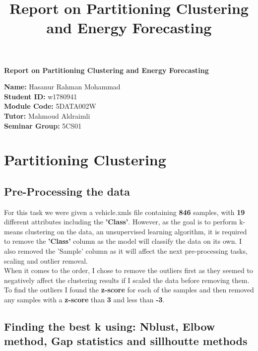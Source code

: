 \documentclass[12pt]{article}
\title{Report on Partitioning Clustering and  Energy Forecasting}
\newcommand{\name}{Hasanur Rahman Mohammad}
\newcommand{\studentID}{w1780941}
\newcommand{\moduleCode}{5DATA002W}
\newcommand{\tutor}{Mahmoud Aldraimli}
\newcommand{\seminarGroup}{5CS01}
\begin{document}
\begin{titlepage}

    \center
    {\LARGE\bfseries Report on Partitioning Clustering and Energy Forecasting}
    \\ [2cm]
    \begin{flushleft}
        \textbf{Name: }\name \\
        \textbf{Student ID: }\studentID \\[0.5cm]
        \textbf{Module Code: }\moduleCode \\
        \textbf{Tutor: }\tutor \\
        \textbf{Seminar Group: }\seminarGroup\\
    \end{flushleft}

\end{titlepage}

\tableofcontents
\newpage

\section{Partitioning Clustering}
\subsection{Pre-Processing the data}
For this task we were given a vehicle.xmls file containing \textbf{846} samples, with \textbf{19} different attributes
including the \textbf{'Class'}. However, as the goal is to perform k-means clustering on the data, an unsupervised learning algorithm,
it is required to remove the \textbf{'Class'} column as the model will classify the data on its own. I also removed the 'Sample' column as it will
affect the next pre-processing tasks, scaling and outlier removal.\\

When it comes to the order, I chose to remove the outliers first as they seemed to negatively affect the clustering results if I scaled the data before removing them.
To find the outliers I found the \textbf{z-score} for each of the samples and then removed any samples with a \textbf{z-score} than \textbf{3} and less than \textbf{-3}.

\subsection{Finding the best k using: Nblust, Elbow method, Gap statistics and sillhoutte methods}
\end{document}
